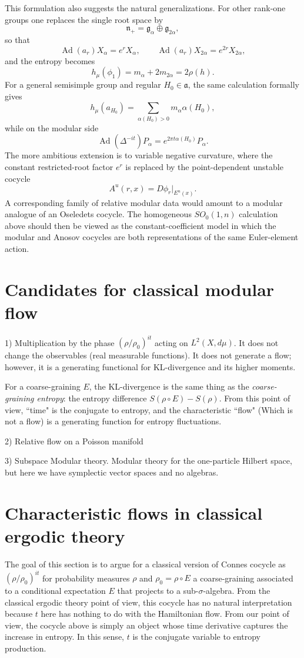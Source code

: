 \documentclass[a4paper,11pt]{article}
\theoremstyle{definition}
\newcommand{\Ad}{\operatorname{Ad}}
\begin{document}
This formulation also suggests the natural generalizations.  For other rank-one groups
one replaces the single root space by
\[
\mathfrak n_+
=
\mathfrak g_\alpha\oplus\mathfrak g_{2\alpha},
\]
so that
\[
\Ad(a_r)X_\alpha=e^rX_\alpha,\qquad
\Ad(a_r)X_{2\alpha}=e^{2r}X_{2\alpha},
\]
and the entropy becomes
\[
h_\mu(\phi_1)
=
m_\alpha+2m_{2\alpha}
=
2\rho(h).
\]
For a general semisimple group and regular \(H_0\in\mathfrak a\), the same calculation
formally gives
\[
h_\mu(a_{H_0})
=
\sum_{\alpha(H_0)>0}
m_\alpha\alpha(H_0),
\]
while on the modular side
\[
\Ad(\Delta^{-it})P_\alpha
=
e^{2\pi t\alpha(H_0)}P_\alpha.
\]
The more ambitious extension is to variable negative curvature, where the constant
restricted-root factor \(e^r\) is replaced by the point-dependent unstable cocycle
\[
A^u(r,x)=D\phi_r|_{E^u(x)}.
\]
A corresponding family of relative modular data would amount to a modular analogue of an
Oseledets cocycle.  The homogeneous \(SO_0(1,n)\) calculation above should then be viewed
as the constant-coefficient model in which the modular and Anosov cocycles are both
representations of the same Euler-element action.

\section{Candidates for classical modular flow}

1) Multiplication by the phase $(\rho/\rho_0)^{it}$ acting on $L^2(X,d\mu)$. It does not change the observables (real measurable functions). It does not generate a flow; however, it is a generating functional for KL-divergence and its higher moments. 

For a coarse-graining $E$, the KL-divergence is the same thing as the {\it coarse-graining entropy}: the entropy difference $S(\rho\circ E)-S(\rho)$.
From this point of view, ``time" is the conjugate to entropy, and the characteristic ``flow" (Which is not a flow) is a generating function for entropy fluctuations.

2) Relative flow on a Poisson manifold

3) Subspace Modular theory. Modular theory for the one-particle Hilbert space, but here we have symplectic vector spaces and no algebras.

\section{Characteristic flows in classical ergodic theory}

The goal of this section is to argue for a classical version of Connes cocycle as $(\rho/\rho_0)^{it}$ for probability measures $\rho$ and $\rho_0=\rho\circ E$ a coarse-graining associated to a conditional expectation $E$ that projects to a sub-$\sigma$-algebra. From the classical ergodic theory point of view, this cocycle has no natural interpretation because $t$ here has nothing to do with the Hamiltonian flow. From our point of view, the cocycle above is simply an object whose time derivative captures the increase in entropy. In this sense, $t$ is the conjugate variable to entropy production. 
\end{document}
